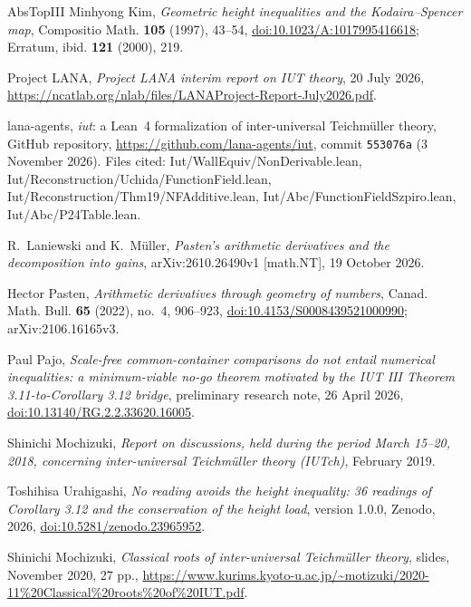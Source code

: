 \documentclass[11pt,a4paper]{article}
\numberwithin{table}{section}
\newcommand{\leanus}{\textunderscore\allowbreak}
\newcommand{\lean}[1]{{\ttfamily\let\_\leanus #1}}
\theoremstyle{plain}
\theoremstyle{definition}
\begin{document}
\begin{thebibliography}{AbsTopIII}
Minhyong Kim, \emph{Geometric height inequalities and the {K}odaira--{S}pencer map}, Compositio Math. \textbf{105}
(1997), 43--54, \href{https://doi.org/10.1023/A:1017995416618}{doi:10.1023/A:1017995416618}; Erratum, ibid. \textbf{121}
(2000), 219.

Project LANA, \emph{Project LANA interim report on IUT theory}, 20 July 2026,
\url{https://ncatlab.org/nlab/files/LANAProject-Report-July2026.pdf}.

lana-agents, \emph{iut}: a Lean~4 formalization of inter-universal {T}eichm\"uller theory, GitHub repository,
\url{https://github.com/lana-agents/iut}, commit \texttt{553076a} (3 November 2026). Files cited:
\lean{Iut/\allowbreak{}WallEquiv/\allowbreak{}NonDerivable.lean},
\lean{Iut/\allowbreak{}Reconstruction/\allowbreak{}Uchida/\allowbreak{}FunctionField.lean},
\lean{Iut/\allowbreak{}Reconstruction/\allowbreak{}Thm19/\allowbreak{}NFAdditive.lean},
\lean{Iut/\allowbreak{}Abc/\allowbreak{}FunctionFieldSzpiro.lean}, \lean{Iut/\allowbreak{}Abc/\allowbreak{}P24Table.lean}.

R.~Laniewski and K.~M\"uller, \emph{Pasten's arithmetic derivatives and the decomposition into gains},
arXiv:2610.26490v1 [math.NT], 19 October 2026.

Hector Pasten, \emph{Arithmetic derivatives through geometry of numbers}, Canad. Math. Bull. \textbf{65} (2022), no.~4,
906--923, \href{https://doi.org/10.4153/S0008439521000990}{doi:10.4153/S0008439521000990}; arXiv:2106.16165v3.

Paul Pajo, \emph{Scale-free common-container comparisons do not entail numerical inequalities: a minimum-viable no-go
theorem motivated by the {IUT} {III} {T}heorem 3.11-to-{C}orollary 3.12 bridge}, preliminary research note,
26 April 2026, \href{https://doi.org/10.13140/RG.2.2.33620.16005}{doi:10.13140/RG.2.2.33620.16005}.

Shinichi Mochizuki, \emph{Report on discussions, held during the period March 15--20, 2018, concerning inter-universal
{T}eichm\"uller theory ({IUTch})}, February 2019.

Toshihisa Urahigashi, \emph{No reading avoids the height inequality: 36 readings of Corollary 3.12 and the conservation
of the height load}, version 1.0.0, Zenodo, 2026,
\href{https://doi.org/10.5281/zenodo.23965952}{doi:10.5281/zenodo.23965952}.

Shinichi Mochizuki, \emph{Classical roots of inter-universal {T}eichm\"uller theory}, slides, November 2020, 27 pp.,
\url{https://www.kurims.kyoto-u.ac.jp/~motizuki/2020-11\%20Classical\%20roots\%20of\%20IUT.pdf}.


\end{thebibliography}
\end{document}
